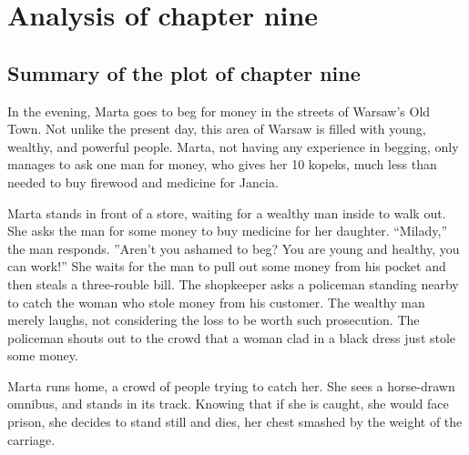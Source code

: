 \section{Analysis of chapter nine}

\subsection{Summary of the plot of chapter nine}

In the evening, Marta goes to beg for money in the streets of Warsaw's Old Town.
Not unlike the present day, this area of Warsaw is filled with young, wealthy, and powerful people.
Marta, not having any experience in begging, only manages to ask one man for money, who gives her 10 kopeks, much less than needed to buy firewood and medicine for Jancia.

Marta stands in front of a store, waiting for a wealthy man inside to walk out.
She asks the man for some money to buy medicine for her daughter.
``Milady,'' the man responds. ''Aren't you ashamed to beg? You are young and healthy, you can work!''
She waits for the man to pull out some money from his pocket and then steals a three-rouble bill.
The shopkeeper asks a policeman standing nearby to catch the woman who stole money from his customer.
The wealthy man merely laughs, not considering the loss to be worth such prosecution.
The policeman shouts out to the crowd that a woman clad in a black dress just stole some money.

Marta runs home, a crowd of people trying to catch her.
She sees a horse-drawn omnibus, and stands in its track.
Knowing that if she is caught, she would face prison, she decides to stand still and dies, her chest smashed by the weight of the carriage.
